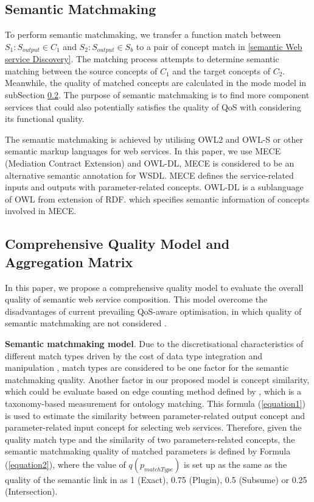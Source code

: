 \documentclass{llncs}
\begin{document}
\subsection{Semantic Matchmaking} \label{semantic_matchmaking}
To perform semantic matchmaking, we transfer a function match between $S_{1}: S_{output} \in C_{1}$ and $S_{2}:S_{output} \in S_{b}$ to a pair of concept match in \ref{semantic Web service Discovery}. The matching process attempts to determine semantic matching between the source concepts of $C_{1}$ and the target concepts of $C_{2}$. Meanwhile, the quality of matched concepts are calculated in the mode model in subSection \ref{qualityModel}. The purpose of semantic matchmaking is to find more component services that could also potentially satisfies the quality of QoS with considering its functional quality.

The semantic matchmaking is achieved by utilising OWL2 and OWL-S or other semantic markup languages for web services. In this paper, we use MECE (Mediation Contract Extension) \cite{bleul2008self} and OWL-DL, MECE is considered to be an alternative semantic annotation for WSDL. MECE defines the service-related inputs and outputs with parameter-related concepts. OWL-DL is a sublanguage of OWL from extension of RDF. which specifies semantic information of concepts involved in MECE. 

\subsection{Comprehensive Quality Model and Aggregation Matrix}\label{qualityModel}
In this paper, we propose a comprehensive quality model to evaluate the overall quality of semantic web service composition. This model overcome the disadvantages of current prevailing QoS-aware optimisation, in which quality of semantic matchmaking are not considered \cite{bansal2016generalized,mier2015integrated,da2016particle,da2015graphevol,yu2013adaptive}.

\textbf{Semantic matchmaking model}. Due to the discretisational characteristics of different match types driven by the cost of  data type integration and manipulation \cite{lecue2009optimizing}, match types are considered to be one factor for the semantic matchmaking quality. Another factor in our proposed model is concept similarity, which could be evaluate based on edge counting method defined by \cite{shet2012new}, which is a taxonomy-based measurement for ontology matching. This formula (\ref{equation1}) is used to estimate the similarity between parameter-related output concept and parameter-related input concept for selecting web services. Therefore, given the quality match type and the similarity of two parameters-related concepts, the semantic matchmaking quality of matched parameters is defined by Formula (\ref{equation2}), where the value of $q(p_ {matchType})$ is set up as the same as the quality of the semantic link in \cite{lecue2009optimizing} as 1 (Exact), 0.75 (Plugin), 0.5 (Subsume) or 0.25 (Intersection). 
\end{document}
